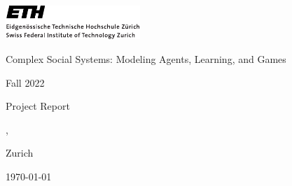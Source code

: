\includegraphics[width=2in]{ETHlogo.pdf}


\begin{center}

\Large \textsf{Complex Social Systems: Modeling Agents, Learning, and Games}

\textsf{Fall 2022}


\normalsize Project Report


\textbf{\huge{\projtitle}}


\Large{ \nameA, \nameB}


\large{
Zurich

\today}

\normalsize

\end{center}
\thispagestyle{empty}

\newpage